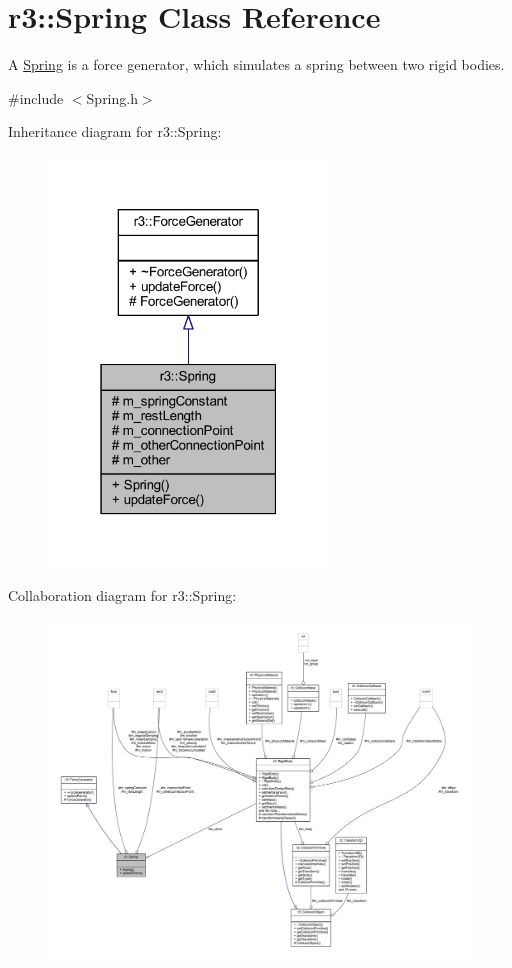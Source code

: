 \hypertarget{classr3_1_1_spring}{}\section{r3\+:\+:Spring Class Reference}
\label{classr3_1_1_spring}


A \mbox{\hyperlink{classr3_1_1_spring}{Spring}} is a force generator, which simulates a spring between two rigid bodies.  




{\ttfamily \#include $<$Spring.\+h$>$}



Inheritance diagram for r3\+:\+:Spring\+:\nopagebreak
\begin{figure}[H]
\begin{center}
\leavevmode
\includegraphics[width=211pt]{classr3_1_1_spring__inherit__graph}
\end{center}
\end{figure}


Collaboration diagram for r3\+:\+:Spring\+:\nopagebreak
\begin{figure}[H]
\begin{center}
\leavevmode
\includegraphics[width=350pt]{classr3_1_1_spring__coll__graph}
\end{center}
\end{figure}
